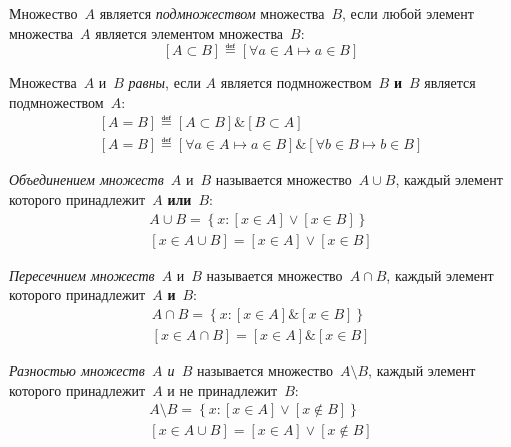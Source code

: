 \begin{example}
Множество~\(A\) является \textit{подмножеством} множества~\(B\), если любой элемент множества~\(A\)
является элементом множества~\(B\):
\[
    \left[A \subset B\right] \eqdef \left[\forall a \in A \mapsto a \in B\right]
\]
\end{example}

\begin{example}
Множества~\(A\) и~\(B\) \textit{равны}, если \(A\) является подмножеством~\(B\) \textbf{и}~\(B\)
является подмножеством~\(A\):
\begin{gather}
    \left[A = B\right] \eqdef \left[A \subset B\right] \& \left[B \subset A\right]\\
    \left[A = B\right]\eqdef \left[\forall a \in A \mapsto a \in B\right] \& \left[\forall b \in B
        \mapsto b \in B\right]
\end{gather}
\end{example}

\begin{example}
\textit{Объединением множеств}~\(A\) и~\(B\) называется множество~\(A \cup B\), каждый элемент
которого принадлежит~\(A\) \textbf{или}~\(B\):
\begin{gather}
    A \cup B = \left\{x: [x \in A] \lor [x \in B]\right\}\\
    \left[x \in A \cup  B\right] = \left[x \in A\right] \lor \left[x \in B\right]
\end{gather}

\end{example}

\begin{example}
\textit{Пересечнием множеств}~\(A\) и~\(B\) называется множество~\(A \cap B\), каждый элемент
которого принадлежит~\(A\) \textbf{и}~\(B\):
\begin{gather}
    A \cap B = \left\{x: [x \in A] \& [x \in B]\right\}\\
    \left[x \in A \cap  B\right] = \left[x \in A\right] \& \left[x \in B\right]
\end{gather}
\end{example}

\begin{example}
\textit{Разностью множеств~\(A\) и~\(B\)} называется множество~\(A \setminus B\), каждый элемент
которого принадлежит~\(A\) и не принадлежит~\(B\):
\begin{gather}
    A \setminus B = \left\{x: [x \in A] \lor [x \notin B]\right\}\\
    \left[x \in A \cup  B\right] = \left[x \in A\right] \lor \left[x \notin B\right]
\end{gather}
\end{example}

